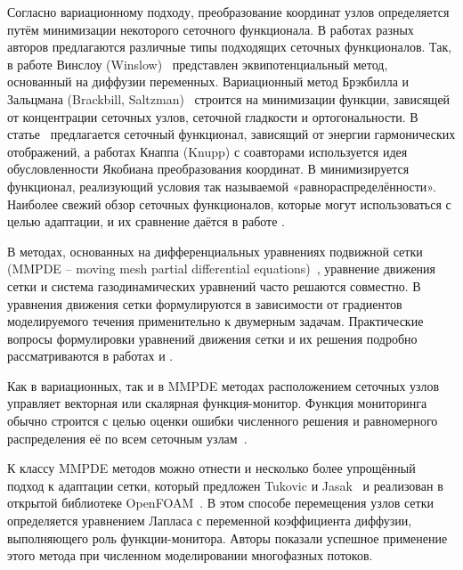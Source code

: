 	Согласно вариационному подходу, преобразование координат узлов определяется путём минимизации некоторого сеточного функционала. В работах разных авторов предлагаются различные типы подходящих сеточных функционалов. Так, в работе Винслоу (Winslow)~\cite{winslow_adaptive-mesh_1981} представлен эквипотенциальный метод, основанный на диффузии переменных. Вариационный метод Брэкбилла и Зальцмана (Brackbill, Saltzman)~\cite{brackbill_adaptive_1982}  строится на минимизации функции, зависящей от концентрации сеточных узлов, сеточной гладкости и ортогональности. В статье~\cite{dvinsky_adaptive_1991}  предлагается сеточный функционал, зависящий от энергии гармонических отображений, а работах Кнаппа (Knupp) с соавторами \cite{knupp_jacobian-weighted_1996, knupp_framework_2000}  используется идея обусловленности Якобиана преобразования координат. В \cite{huang_variational_2001}  минимизируется функционал, реализующий условия так называемой «равнораспределённости». Наиболее свежий обзор сеточных функционалов, которые могут использоваться с целью адаптации, и их сравнение даётся в работе \cite{huang_comparative_2015}.
	
	В методах, основанных на дифференциальных уравнениях подвижной сетки (MMPDE – moving mesh partial differential equations)~\cite{huang_moving_1994}, уравнение движения сетки и система газодинамических уравнений часто решаются совместно. В \cite{huang_moving_1998, huang_analysis_1997, huang_high_1998} уравнения движения сетки формулируются в зависимости от градиентов моделируемого течения применительно к двумерным задачам. Практические вопросы формулировки уравнений движения сетки и их решения подробно рассматриваются в работах \cite{huang_practical_2001} и \cite{budd_adaptivity_2009}.
	
	Как в вариационных, так и в MMPDE методах расположением сеточных узлов управляет векторная или скалярная функция-монитор. Функция мониторинга обычно строится с целью оценки ошибки численного решения и равномерного распределения её по всем сеточным узлам~\cite{cao_study_1999}.
	
	К классу MMPDE методов можно отнести и несколько более упрощённый подход к адаптации сетки, который предложен Tukovic и Jasak~\cite{jasak_automatic_2006, tukovic_moving_2012} и реализован в открытой библиотеке OpenFOAM~\cite{jasak_dynamic_2010}. В этом способе перемещения узлов сетки определяется уравнением Лапласа с переменной коэффициента диффузии, выполняющего роль функции-монитора. Авторы показали успешное применение этого метода при численном моделировании многофазных потоков.
	
